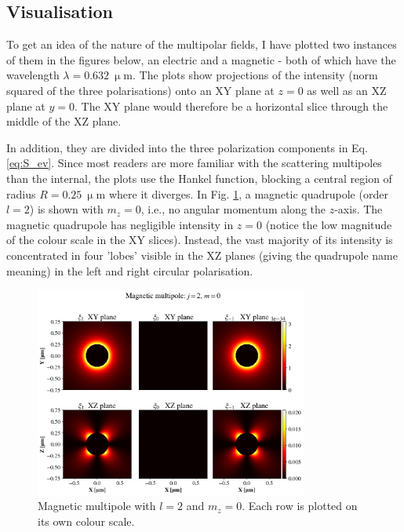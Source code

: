 \subsection{Visualisation}
To get an idea of the nature of the multipolar fields, I have plotted two instances of them in the figures below, an electric and a magnetic - both of which have the wavelength \( \lambda = 0.632\ \mathrm{\upmu m} \). The plots show projections of the intensity (norm squared of the three polarisations) onto an XY plane at \( z = 0 \) as well as an XZ plane at \( y = 0 \). The XY plane would therefore be a horizontal slice through the middle of the XZ plane.

In addition, they are divided into the three polarization components in Eq. \ref{eq:S_ev}. Since most readers are more familiar with the scattering multipoles than the internal, the plots use the Hankel function, blocking a central region of radius \( R = 0.25\ \mathrm{\upmu m} \) where it diverges. 
In Fig. \ref{fig:mpole}, a magnetic quadrupole (order \( l = 2 \)) is shown with \( m_z = 0 \), i.e., no angular momentum along the \( z \)-axis. 
The magnetic quadrupole has negligible intensity in \( z = 0 \) (notice the low magnitude of the colour scale in the XY slices). Instead, the vast majority of its intensity is concentrated in four 'lobes' visible in the XZ planes (giving the quadrupole name meaning) in the left and right circular polarisation.

\begin{figure}
    \includegraphics[trim={0 0cm 0 2cm},clip,width=0.8\textwidth]{Figures/mpolej2m0.png}
    \caption{Magnetic multipole with \( l = 2 \) and \( m_z = 0 \). Each row is plotted on its own colour scale.}
    \label{fig:mpole}
\end{figure}

